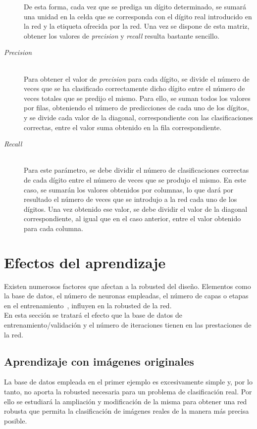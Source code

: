 \begin{description}
	De esta forma, cada vez que se prediga un dígito determinado, se sumará una unidad en la celda que se corresponda con el dígito real introducido en la red y la etiqueta ofrecida por la red. Una vez se dispone de esta matriz, obtener los valores de \textit{precision} y \textit{recall} resulta bastante sencillo.
	\vspace{5pt}
	\item[\textit{Precision}] \hfill 
	\vspace{5pt}
	\\
	Para obtener el valor de \textit{precision} para cada dígito, se divide el número de veces que se ha clasificado correctamente dicho dígito entre el número de veces totales que se predijo el mismo. Para ello, se suman todos los valores por filas, obteniendo el número de predicciones de cada uno de los dígitos, y se divide cada valor de la diagonal, correspondiente con las clasificaciones correctas, entre el valor suma obtenido en la fila correspondiente.
	\vspace{5pt}
	\item[\textit{Recall}] \hfill 
	\vspace{5pt}
	\\
	Para este parámetro, se debe dividir el número de clasificaciones correctas de cada dígito entre el número de veces que se produjo el mismo. En este caso, se sumarán los valores obtenidos por columnas, lo que dará por resultado el número de veces que se introdujo a la red cada uno de los dígitos. Una vez obtenido ese valor, se debe dividir el valor de la diagonal correspondiente, al igual que en el caso anterior, entre el valor obtenido para cada columna.
\end{description}
\vspace{10pt}
\section{Efectos del aprendizaje} \label{sec.aprendizaje}
Existen numerosos factores que afectan a la robusted del diseño. Elementos como la base de datos, el número de neuronas empleadas, el número de capas o etapas en el entrenamiento~\cite{lopez2008redes}, influyen en la robusted de la red.\\

En esta sección se tratará el efecto que la base de datos de entrenamiento/validación y el número de iteraciones tienen en las prestaciones de la red.

\subsection{Aprendizaje con imágenes originales}
La base de datos empleada en el primer ejemplo es excesivamente simple y, por lo tanto, no aporta la robusted necesaria para un problema de clasificación real. Por ello se estudiará la ampliación y modificación de la misma para obtener una red robusta que permita la clasificación de imágenes reales de la manera más precisa posible.\\

